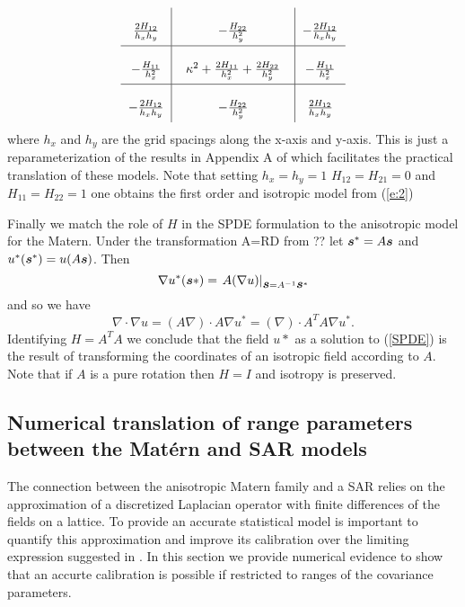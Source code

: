 \documentclass[review]{elsarticle}
\begin{document}
\begin{equation}
\label{e:3}
       \arraycolsep=6.0pt\def\arraystretch{2.5}
   \begin{array}{c|c|c}
      \frac{2H_{12}}{h_x h_y} & -\frac{H_{22}}{h_y^2} & -\frac{2H_{12}}{h_x h_y} \\
        \hline
      -\frac{H_{11}}{h_x^2} & \;\; \kappa^2 + \frac{2H_{11}}{h_x^2} + \frac{2H_{22}}{h_y^2} \;\; & -\frac{H_{11}}{h_x^2} \\
      \hline
      -\frac{2H_{12}}{h_x h_y} & -\frac{H_{22}}{h_y^2} & \frac{2H_{12}}{h_x h_y} \\
    \end{array} 
\end{equation}
where $h_x$ and $h_y$ are the grid spacings along the x-axis and y-axis. This is just a reparameterization of the results in Appendix A of \cite{lindgren2011explicit} which facilitates the practical translation of these models. Note that setting $h_x = h_y =1$  $H_{12} = H_{21} =0$ and $H_{11} = H_{22} = 1$ one obtains the first order and isotropic model from (\ref{e:2})

Finally we match the role of $H$ in the SPDE formulation to the anisotropic model for the Matern.   Under the transformation A=RD from ?? let $\mbox{\boldmath $s$}^* =  A \mbox{\boldmath $s$} $ and $u^*(\mbox{\boldmath $s$}^*) = u( A\mbox{\boldmath $s$})$.
 Then 
\[ \nabla u^*( \mbox{\boldmath $s$}*) =    \left. A (\nabla u) \right| _{\mbox{\boldmath $s$}= A^{-1} \mbox{\boldmath $s$}^*}  \]
 and so we have  
 \[ \nabla \cdot \nabla u  =  (A \nabla) \cdot A \nabla u^*  =  (\nabla) \cdot A^T A \nabla u^* . \] 
Identifying  $H= A^TA$ we conclude that the  field $u*$ as a solution to (\ref{SPDE})   is the result of transforming the coordinates of an isotropic field according to $A$. Note that if $A$ is a pure rotation then $H=I$ and isotropy is preserved. 

\subsection{Numerical translation of range parameters between the Mat\'ern and SAR models}
\label{ss:1}

The connection between the anisotropic Matern family and a SAR relies on the approximation of a discretized Laplacian operator with finite differences of the fields on a lattice.  To provide an accurate statistical model is important to quantify this approximation and improve its calibration over the limiting expression suggested in \cite{lindgren2011explicit}. In this section we provide numerical evidence to show that an accurte calibration is possible if restricted to ranges of the covariance parameters. 
\end{document}
